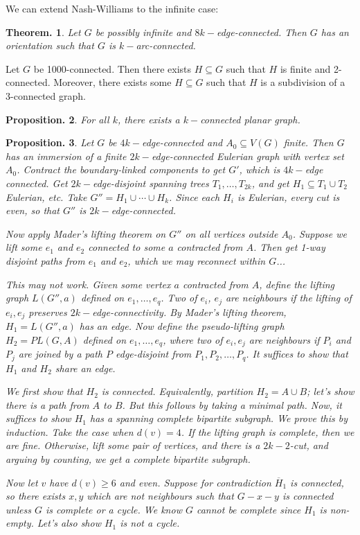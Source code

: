 \documentclass[11pt, a4paper]{memoir}
\theoremstyle{change}
\newtheorem{theorem}{Theorem.}[section]
\newtheorem{proposition}[theorem]{Proposition.}
\theoremstyle{plain}
\theoremstyle{nonumberplain}
\numberwithin{equation}{section}
\begin{document}
We can extend Nash-Williams to the infinite case:
\begin{theorem}
    Let $G$ be possibly infinite and $8k-$edge-connected.
    Then $G$ has an orientation such that $G$ is $k-$arc-connected.
\end{theorem}
Let $G$ be 1000-connected.
Then there exists $H\subseteq G$ such that $H$ is finite and 2-connected.
Moreover, there exists some $H\subseteq G$ such that $H$ is a subdivision of a 3-connected graph.
\begin{proposition}
    For all $k$, there exists a $k-$connected planar graph.
\end{proposition}
\begin{proposition}
    Let $G$ be $4k-$edge-connected and $A_0\subseteq V(G)$ finite.
    Then $G$ has an immersion of a finite $2k-$edge-connected Eulerian graph with vertex set $A_0$.
    Contract the boundary-linked components to get $G'$, which is $4k-$edge connected.
    Get $2k-$edge-disjoint spanning trees $T_1,\ldots,T_{2k}$, and get $H_1\subseteq T_1\cup T_2$ Eulerian, etc.
    Take $G''=H_1\cup\cdots\cup H_k$.
    Since each $H_i$ is Eulerian, every cut is even, so that $G''$ is $2k-$edge-connected.

    Now apply Mader's lifting theorem on $G''$ on all vertices outside $A_0$.
    Suppose we lift some $e_1$ and $e_2$ connected to some $a$ contracted from $A$.
    Then get 1-way disjoint paths from $e_1$ and $e_2$, which we may reconnect within $G$...

    This may not work.
    Given some vertex $a$ contracted from $A$, define the lifting graph $L(G'',a)$ defined on $e_1,\ldots,e_q$.
    Two of $e_i$, $e_j$ are neighbours if the lifting of $e_i,e_j$ preserves $2k-$edge-connectivity.
    By Mader's lifting theorem, $H_1=L(G'',a)$ has an edge.
    Now define the pseudo-lifting graph $H_2=PL(G,A)$ defined on $e_1,\ldots,e_q$, where two of $e_i,e_j$ are neighbours if $P_i$ and $P_j$ are joined by a path $P$ edge-disjoint from $P_1,P_2,\ldots,P_q$.
    It suffices to show that $H_1$ and $H_2$ share an edge.
    
    We first show that $H_2$ is connected.
    Equivalently, partition $H_2=A\cup B$; let's show there is a path from $A$ to $B$.
    But this follows by taking a minimal path.
    Now, it suffices to show $H_1$ has a spanning complete bipartite subgraph.
    We prove this by induction.
    Take the case when $d(v)=4$.
    If the lifting graph is complete, then we are fine.
    Otherwise, lift some pair of vertices, and there is a $2k-2$-cut, and arguing by counting, we get a complete bipartite subgraph.

    Now let $v$ have $d(v)\geq 6$ and even.
    Suppose for contradiction $\overline{H}_1$ is connected, so there exists $x,y$ which are not neighbours such that $G-x-y$ is connected unless $G$ is complete or a cycle.
    We know $G$ cannot be complete since $H_1$ is non-empty.
    Let's also show $H_1$ is not a cycle.
\end{proposition}
\end{document}
